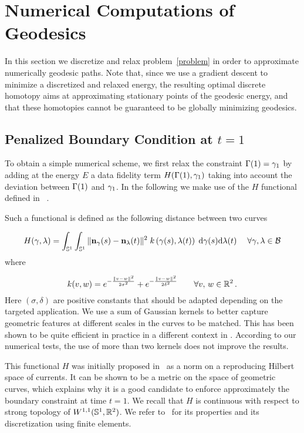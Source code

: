 
\section{Numerical Computations of Geodesics}
\label{discretization}

In this section we discretize and relax problem~\eqref{problem} in order to approximate numerically  geodesic paths. Note that, since we use a gradient descent to minimize a discretized and relaxed energy, the resulting optimal discrete homotopy aims at approximating stationary points of the geodesic energy, and that these homotopies cannot be guaranteed to be globally minimizing geodesics. 


\subsection{Penalized Boundary Condition at $t=1$}

To obtain a simple numerical scheme, we first relax the constraint $\Gamma(1)=\gamma_1$ by adding at the energy $E$ a data fidelity term $H(\Gamma(1), \gamma_1)$ taking into account the deviation between $\Gamma(1)$ and $\gamma_1$. In the following we make use of the $H$ functional defined  in~\cite[equation 5.4]{Rigid-evol} .

Such a functional is defined as the following distance between two curves

$$H(\gamma,\lambda) = \int_{\mathbb{S}^1} \int_{\mathbb{S}^1} \|\mathbf{n}_{\gamma}(s) - \mathbf{n}_{\lambda}(t)\|^2 \; 
	k\left( \gamma(s) , \lambda(t) \right)\; \mathrm{d} \gamma(s) \mathrm{d} \lambda(t)\; \quad 
	\forall \gamma, \lambda \in \mathcal{B}$$
where

$$	k(v, w) =  e^{-\frac{\|v-w\|^2}{2\sigma^2}} + e^{-\frac{\|v-w\|^2}{2\delta^2} } 
	\quad \quad \forall v,\,w\in {\mathbb R}^2\,.
$$
Here $(\sigma,\delta)$ are positive constants that should be adapted depending on the targeted application. We use a sum of Gaussian kernels to better
capture geometric features at different scales in the curves to be matched. This has been shown to be quite
efficient in practice in a different context in \cite{FX-ref}. According to our numerical tests, the use of more than two kernels does not improve the results.

This functional $H$ was initially proposed in~\cite{currents-matching} as a norm on a reproducing Hilbert space of currents.
 It can be shown to be a metric on the space of geometric curves, which explains why it is a good candidate to enforce approximately the boundary constraint at time $t=1$. We recall that $H$ is continuous with respect to strong topology of $W^{1,1}(\mathbb{S}^1,\mathbb{R}^2)$. We refer to~\cite{Rigid-evol} for its properties and its discretization using finite elements. 

